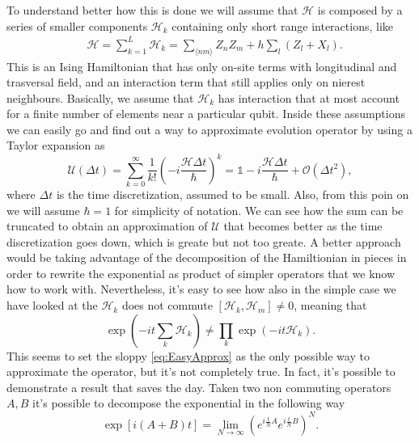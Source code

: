 To understand better how this is done we will assume that $\mathcal{H}$ is composed by a series of smaller components $\mathcal{H}_k$ containing only short range interactions, like
\begin{align}
    &\mathcal{H} = \sum_{k=1}^L \mathcal{H}_k = \sum_{\langle nm \rangle} Z_nZ_m +h\sum_l\left( Z_l + X_l \right).
\end{align}
This is an Ising Hamiltonian that has only on-site terms with longitudinal and trasversal field, and an interaction term that still applies only on nierest neighbours. Basically, we assume that $\mathcal{H}_k$ has interaction that at most account for a finite number of elements near a particular qubit. Inside these assumptions we can easily go and find out a way to approximate evolution operator by using a Taylor expansion as
\begin{equation}
    \label{eq:EasyApprox}
    \mathcal{U}(\Delta t) = \sum_{k=0}^\infty \frac{1}{k!}\left( -i\frac{\mathcal{H}\Delta t}{\hbar} \right)^k = \mathbb{1} - i\frac{\mathcal{H}\Delta t}{\hbar} + \mathcal{O}(\Delta t^2),
\end{equation}
where $\Delta t$ is the time discretization, assumed to be small. Also, from this poin on we will assume $\hbar = 1$ for simplicity of notation. We can see how the sum can be truncated to obtain an approximation of $\mathcal{U}$ that becomes better as the time discretization goes down, which is greate but not too greate. A better approach would be taking advantage of the decomposition of the Hamiltionian in pieces in order to rewrite the exponential as product of simpler operators that we know how to work with. Nevertheless, it's easy to see how also in the simple case we have looked at the $\mathcal{H}_k$ does not commute $\left[ \mathcal{H}_k, \mathcal{H}_m \right] \neq 0$, meaning that
\begin{equation}
    \exp\left( -it\sum_k\mathcal{H}_k \right) \neq \prod_{k}\exp(-it\mathcal{H}_k).
\end{equation}
This seems to set the sloppy \eqref{eq:EasyApprox} as the only possible way to approximate the operator, but it's not completely true. In fact, it's possible to demonstrate a result that saves the day.
{
    Taken two non commuting operators $A, B$ it's possible to decompose the exponential in the following way
    \begin{equation}
        \exp\left[ i\left( A + B \right)t \right] = \lim_{N\to\infty}\left( e^{i\frac{t}{N}A}e^{i\frac{t}{N}B} \right)^N.
    \end{equation}
}
